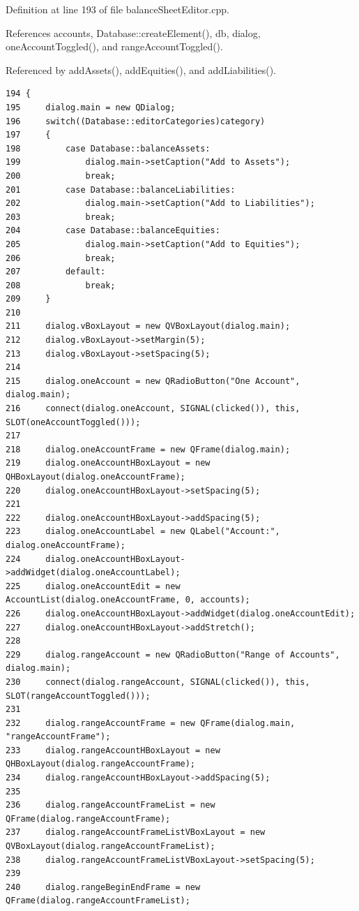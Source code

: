 Definition at line 193 of file balance\-Sheet\-Editor.cpp.

References accounts, Database::create\-Element(), db, dialog, one\-Account\-Toggled(), and range\-Account\-Toggled().

Referenced by add\-Assets(), add\-Equities(), and add\-Liabilities().

\footnotesize\begin{verbatim}194 {
195     dialog.main = new QDialog;
196     switch((Database::editorCategories)category)
197     {
198         case Database::balanceAssets:
199             dialog.main->setCaption("Add to Assets");
200             break;
201         case Database::balanceLiabilities:
202             dialog.main->setCaption("Add to Liabilities");
203             break;
204         case Database::balanceEquities:
205             dialog.main->setCaption("Add to Equities");
206             break;
207         default:
208             break;
209     }
210     
211     dialog.vBoxLayout = new QVBoxLayout(dialog.main);
212     dialog.vBoxLayout->setMargin(5);
213     dialog.vBoxLayout->setSpacing(5);
214     
215     dialog.oneAccount = new QRadioButton("One Account", dialog.main);
216     connect(dialog.oneAccount, SIGNAL(clicked()), this, SLOT(oneAccountToggled()));
217         
218     dialog.oneAccountFrame = new QFrame(dialog.main);
219     dialog.oneAccountHBoxLayout = new QHBoxLayout(dialog.oneAccountFrame);
220     dialog.oneAccountHBoxLayout->setSpacing(5);
221     
222     dialog.oneAccountHBoxLayout->addSpacing(5);
223     dialog.oneAccountLabel = new QLabel("Account:", dialog.oneAccountFrame);
224     dialog.oneAccountHBoxLayout->addWidget(dialog.oneAccountLabel);
225     dialog.oneAccountEdit = new AccountList(dialog.oneAccountFrame, 0, accounts);
226     dialog.oneAccountHBoxLayout->addWidget(dialog.oneAccountEdit);
227     dialog.oneAccountHBoxLayout->addStretch();
228        
229     dialog.rangeAccount = new QRadioButton("Range of Accounts", dialog.main);
230     connect(dialog.rangeAccount, SIGNAL(clicked()), this, SLOT(rangeAccountToggled()));
231        
232     dialog.rangeAccountFrame = new QFrame(dialog.main, "rangeAccountFrame");
233     dialog.rangeAccountHBoxLayout = new QHBoxLayout(dialog.rangeAccountFrame);
234     dialog.rangeAccountHBoxLayout->addSpacing(5);
235     
236     dialog.rangeAccountFrameList = new QFrame(dialog.rangeAccountFrame);
237     dialog.rangeAccountFrameListVBoxLayout = new QVBoxLayout(dialog.rangeAccountFrameList);
238     dialog.rangeAccountFrameListVBoxLayout->setSpacing(5);
239     
240     dialog.rangeBeginEndFrame = new QFrame(dialog.rangeAccountFrameList);

\end{verbatim}
